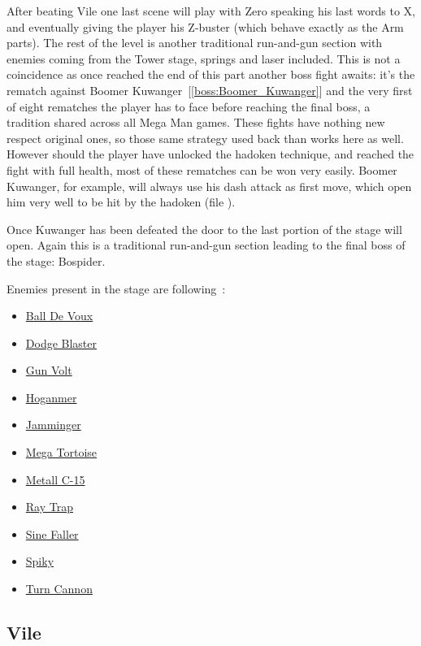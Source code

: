 After beating Vile one last scene will play with Zero speaking his last words to X, and eventually giving the player his Z-buster (which behave exactly as the Arm parts). The rest of the level is another traditional run-and-gun section with enemies coming from the Tower stage, springs and laser included. This is not a coincidence as once reached the end of this part another boss fight awaits: it's the rematch against Boomer Kuwanger~[\ref{boss:Boomer_Kuwanger}] and the very first of eight rematches the player has to face before reaching the final boss, a tradition shared across all Mega Man games. These fights have nothing new respect original ones, so those same strategy used back than works here as well. However should the player have unlocked the hadoken technique, and reached the fight with full health, most of these rematches can be won very easily. Boomer Kuwanger, for example, will always use his dash attack as first move, which open him very well to be hit by the hadoken (file ).

Once Kuwanger has been defeated the door to the last portion of the stage will open. Again this is a traditional run-and-gun section leading to the final boss of the stage: Bospider.

Enemies present in the stage are following~\cite{wiki:sigma_stages}:
\begin{itemize}
	\item \hyperlink {enem:Ball_De_Voux}{Ball De Voux}
	\item \hyperlink {enem:Dodge_Blaster}{Dodge Blaster}
	\item \hyperlink {enem:Gun_Volt}{Gun Volt}
	\item \hyperlink {enem:Hoganmer}{Hoganmer}
	\item \hyperlink {enem:Jamminger}{Jamminger}
	\item \hyperlink {enem:Mega_Tortoise}{Mega Tortoise}
	\item \hyperlink {enem:Metall_C-15}{Metall C-15}
	\item \hyperlink {enem:Ray_Trap}{Ray Trap}
	\item \hyperlink {enem:Sine_Faller}{Sine Faller}
	\item \hyperlink {enem:Spiky}{Spiky}
	\item \hyperlink {enem:Turn_Cannon}{Turn Cannon}
\end{itemize}

\subsection{Vile}\label{boss:vile}

